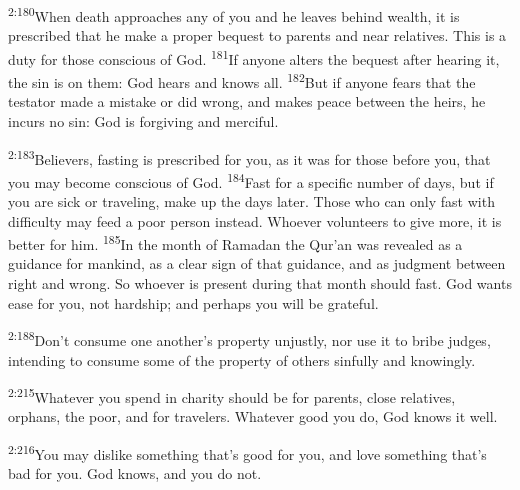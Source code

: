 \documentclass[openany,12pt,english]{book}
\newenvironment{para}{\par\pretolerance=100\tolerance=200\setlength{\emergencystretch}{0.6em}\relax}{\par}
\begin{document}
\begin{para}
    \textsuperscript{2:180}\thinspace{}When death approaches any of you and he leaves be\-hind wealth, it is pre\-scribed that he make a prop\-er be\-quest to parents and near relatives. This is a du\-ty for those con\-scious of God.
    \textsuperscript{181}\thinspace{}If any\-one alters the be\-quest af\-ter hear\-ing it, the sin is on them: God hears and knows all.
    \textsuperscript{182}\thinspace{}But if any\-one fears that the tes\-ta\-tor made a mis\-take or did wrong, and makes peace be\-tween the heirs, he incurs no sin: God is for\-giv\-ing and mer\-ci\-ful.
\end{para}

\begin{para}
    \textsuperscript{2:183}\thinspace{}Believers, fasting is pre\-scribed for you, as it was for those be\-fore you, that you may be\-come con\-scious of God.
    \textsuperscript{184}\thinspace{}Fast for a spe\-cif\-ic num\-ber of days, but if you are sick or trav\-el\-ing, make up the days lat\-er. Those who can on\-ly fast with dif\-fi\-cul\-ty may feed a poor per\-son in\-stead. Who\-ev\-er volunteers to give more, it is bet\-ter for him.
    \textsuperscript{185}\thinspace{}In the month of Ramadan the Qur'an was revealed as a guid\-ance for man\-kind, as a clear sign of that guid\-ance, and as judg\-ment be\-tween right and wrong. So who\-ev\-er is pres\-ent dur\-ing that month should fast. God wants ease for you, not hard\-ship; and per\-haps you will be grate\-ful.
\end{para}

\begin{para}
    \textsuperscript{2:188}\thinspace{}Don't con\-sume one another's prop\-er\-ty un\-just\-ly, nor use it to bribe judges, intending to con\-sume some of the prop\-er\-ty of others sin\-ful\-ly and know\-ing\-ly.
\end{para}

\begin{para}
    \textsuperscript{2:215}\thinspace{}What\-ev\-er you spend in char\-i\-ty should be for parents, close relatives, orphans, the poor, and for travelers. What\-ev\-er good you do, God knows it well.
\end{para}

\begin{para}
    \textsuperscript{2:216}\thinspace{}You may dis\-like some\-thing that's good for you, and love some\-thing that's bad for you. God knows, and you do not.
\end{para}
\end{document}
